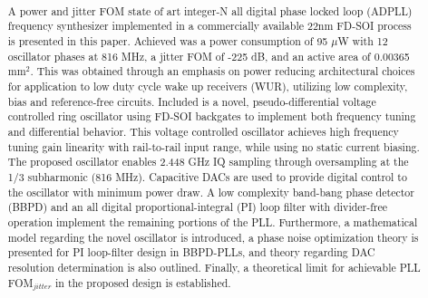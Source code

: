 

\pagestyle{fancy}
\fancyhf{}
\fancyhead[LE,RO]{\fontfamily{\sfdefault}\selectfont \textbf{\rightmark}}
\title{\textbf{}}
\date{}

\sloppy\RaggedRight\raggedbottom
	
	
	\pagebreak

	\justify
	\setcounter{page}{1}
	\thispagestyle{nohdr}
	\large\fontfamily{\sfdefault}\selectfont \		
	\begin{abstract} \large\fontfamily{\rmdefault}\selectfont \
		
		\vspace{-2em}A power and jitter FOM state of art integer-N all digital phase locked loop (ADPLL) frequency synthesizer implemented in a commercially available 22nm FD-SOI process is presented in this paper. Achieved was a power consumption of 95 $\mu$W with 12 oscillator phases at 816 MHz, a jitter FOM of -225 dB, and an active area of 0.00365 mm$^2$. This was obtained through an emphasis on power reducing architectural choices for application to low duty cycle wake up receivers (WUR), utilizing low complexity, bias and reference-free circuits. Included is a novel, pseudo-differential voltage controlled ring oscillator using FD-SOI backgates to implement both frequency tuning and differential behavior. This voltage controlled oscillator achieves high frequency tuning gain linearity with rail-to-rail input range, while using no static current biasing. The proposed oscillator enables 2.448 GHz IQ sampling through oversampling at the 1/3 subharmonic (816 MHz). Capacitive DACs are used to provide digital control to the oscillator with minimum power draw. A low complexity band-bang phase detector (BBPD) and an all digital proportional-integral (PI) loop filter with divider-free operation implement the remaining portions of the PLL. Furthermore, a mathematical model regarding the novel oscillator is introduced, a phase noise optimization theory is presented for PI loop-filter design in BBPD-PLLs, and theory regarding DAC resolution determination is also outlined. Finally, a theoretical limit for achievable PLL FOM$_{jitter}$ in the proposed design is established.
	\end{abstract}

